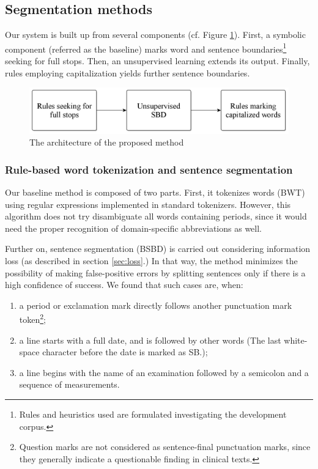 \subsection{Segmentation methods}
\label{sec:clinical_segmentation}

Our system is built up from several components (cf. Figure \ref{fig:clin-segment-arch}). 
First, a symbolic component (referred as the baseline) marks word and sentence boundaries\footnote{Rules and heuristics used are formulated investigating the development corpus.} seeking for full stops. 
Then, an unsupervised learning extends its output.
Finally, rules employing capitalization yields further sentence boundaries.

\begin{figure}[H]
  \centering
  \includegraphics[scale=0.2]{Clinical/clin_segm_arch.png} 
  \caption{The architecture of the proposed method}
  \label{fig:clin-segment-arch}
\end{figure}

\subsubsection{Rule-based word tokenization and sentence segmentation}

Our baseline method is composed of two parts. 
First, it tokenizes words (BWT) using regular expressions implemented in standard tokenizers. %
However, this algorithm does not try disambiguate all words containing periods, since it would need the proper recognition of domain-specific abbreviations as well. %

Further on, sentence segmentation (BSBD) is carried out considering information loss (as described in section \ref{sec:loss}.) 
In that way, the method minimizes the possibility of making false-positive errors by splitting sentences only if there is a high confidence of success. 
We found that such cases are, when:
\begin{enumerate} 
 \item a period or exclamation mark directly follows another punctuation mark token\footnote{Question marks are not considered as sentence-final punctuation marks, since they generally indicate a questionable finding in clinical texts.};
 \item a line starts with a full date, and is followed by other words (The last white-space character before the date is marked as SB.);
 \item a line begins with the name of an examination followed by a semicolon and a sequence of measurements.
\end{enumerate}

